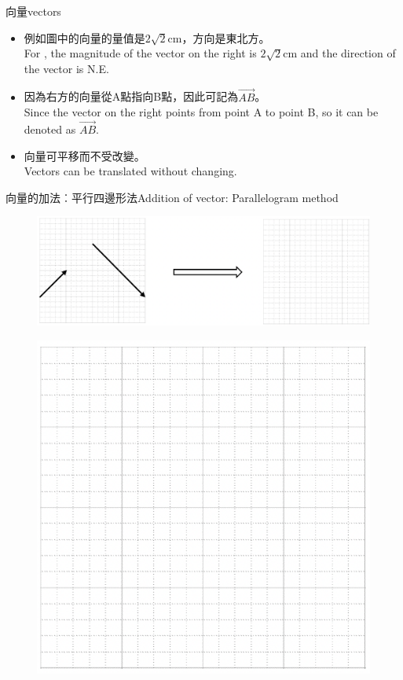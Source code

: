\documentclass[beamer=true]{standalone}
\begin{document}
\begin{frame}{向量vectors}
    \begin{itemize}
        \item 例如圖中的向量的量值是$2\sqrt{2}$cm，方向是東北方。 \\For , the magnitude of the vector on the right is $2\sqrt{2}$cm and the direction of the vector is N.E.
        \item 因為右方的向量從A點指向B點，因此可記為$\vec{AB}$。 \\Since the vector on the right points from point A to point B, so it can be denoted as $\vec{AB}$.
        \item
              向量可平移而不受改變。\\Vectors can be translated without changing.
    \end{itemize}
    \begin{figure}[h!]
        \centering
    \end{figure}
\end{frame}
\begin{frame}{向量的加法︰平行四邊形法Addition of vector: Parallelogram method}
    \begin{figure}[h!]
        \centering
        \includegraphics[width=.9\textwidth]{../../assets/3cc60b5d.png}
    \end{figure}
    \begin{figure}[h!]
        \centering
        \includegraphics[width=.3\textwidth]{../../assets/45d03651.png}
    \end{figure}
\end{frame}
\end{document}
